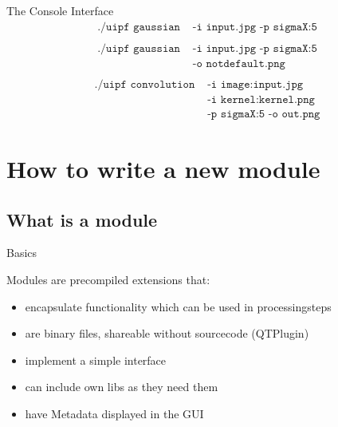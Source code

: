 \documentclass{beamer}
\begin{document}
\begin{frame}{The Console Interface}
\Large
	\begin{align*}
		\texttt{./uipf gaussian} & \texttt{ -i input.jpg -p sigmaX:5} \\
	\end{align*}
	\vspace{-1.5cm}\pause
	\begin{align*}
		\texttt{./uipf gaussian} & \texttt{ -i input.jpg -p sigmaX:5} \\
								 & \texttt{ -o notdefault.png}\\
	\end{align*}
	\vspace{-1.5cm}\pause
	\begin{align*}
		\texttt{./uipf convolution} & \texttt{ -i image:input.jpg} \\
									& \texttt{ -i kernel:kernel.png} \\
									& \texttt{ -p sigmaX:5 -o out.png}
	\end{align*}

\end{frame}



\section{How to write a new module}

\subsection{What is a module}
\begin{frame}[fragile]{Basics}

Modules are precompiled extensions that:
	\begin{itemize}
		\item encapsulate functionality which can be used in processingsteps
		\item are binary files, shareable without sourcecode (QTPlugin)
		\item implement a simple interface
		\item can include own libs as they need them
		\item have Metadata displayed in the GUI
	\end{itemize}

\end{frame}
\end{document}
